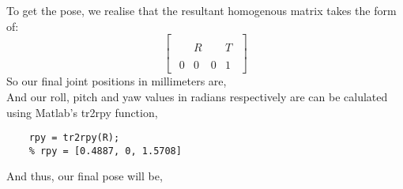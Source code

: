 To get the pose, we realise that the resultant homogenous matrix takes the form of:
\begin{equation*}
    \begin{bmatrix}
        {\begin{array}{ccc|c}&&&\\&R&&T\\&&&\\\hline 0&0&0&1\end{array}}
    \end{bmatrix}
\end{equation*}
So our final joint positions in millimeters are,
\begin{equation*}
    [421.3330, -133.3000, -298.6978]
\end{equation*}
And our roll, pitch and yaw values in radians respectively are can be calulated using Matlab's tr2rpy function,
\begin{center}
    \begin{lstlisting}
    rpy = tr2rpy(R);
    % rpy = [0.4887, 0, 1.5708]
    \end{lstlisting}
\end{center}
And thus, our final pose will be,
\begin{equation*}
    [421.3330, -133.3000, -298.6978, 0.4887, 0, 1.5708]
\end{equation*}
